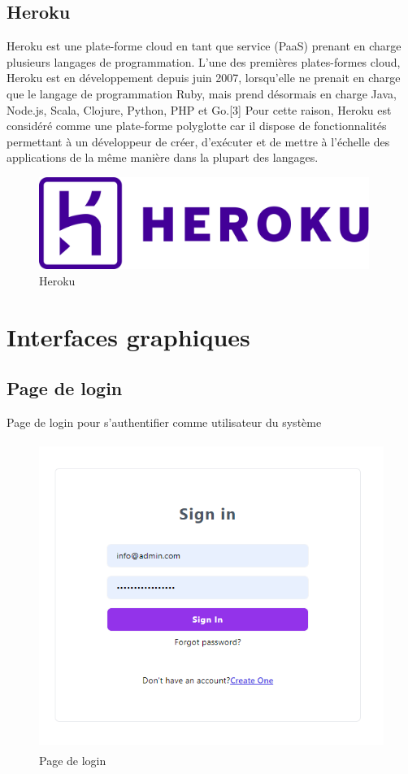 \subsection{Heroku}

Heroku est une plate-forme cloud en tant que service (PaaS) prenant en charge plusieurs langages de programmation. L'une des premières plates-formes cloud, Heroku est en développement depuis juin 2007, lorsqu'elle ne prenait en charge que le langage de programmation Ruby, mais prend désormais en charge Java, Node.js, Scala, Clojure, Python, PHP et Go.[3] Pour cette raison, Heroku est considéré comme une plate-forme polyglotte car il dispose de fonctionnalités permettant à un développeur de créer, d'exécuter et de mettre à l'échelle des applications de la même manière dans la plupart des langages.


\begin{figure}[!h]
\begin{center}
\includegraphics[height=3cm]{heroku.svg.png}
\end{center}
\caption{Heroku}
\end{figure}


\section{Interfaces graphiques}

\subsection{Page de login}

Page de login pour s'authentifier comme utilisateur du système
\begin{figure}[!h]
\begin{center}
\includegraphics[height=10cm]{log.png}
\end{center}
\caption{Page de login }
\end{figure}


